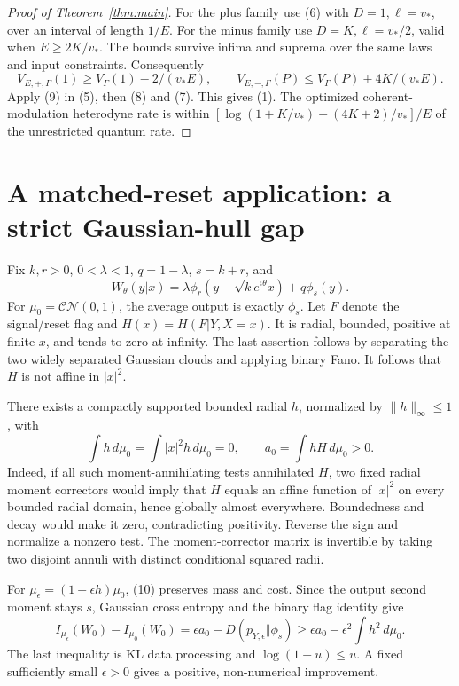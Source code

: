 \documentclass[11pt]{article}
\newcommand{\CN}{\mathcal{CN}}
\begin{document}
\begin{proof}[Proof of Theorem~\ref{thm:main}]
For the plus family use (6) with \(D=1,\ell=v_*\), over an interval
of length \(1/E\). For the minus family use \(D=K,\ell=v_*/2\),
valid when \(E\geq2K/v_*\). The bounds survive infima and suprema over
the same laws and input constraints. Consequently
\[
 V_{E,+,\Gamma}(1)\geq V_\Gamma(1)-2/(v_*E),\qquad
 V_{E,-,\Gamma}(P)\leq V_\Gamma(P)+4K/(v_*E).
\]
Apply (9) in (5), then (8) and (7). This gives (1).
The optimized coherent-modulation heterodyne rate is within
\([\log(1+K/v_*)+(4K+2)/v_*]/E\) of the unrestricted quantum rate.
\end{proof}

\section{A matched-reset application: a strict Gaussian-hull gap}

Fix \(k,r>0\), \(0<\lambda<1\), \(q=1-\lambda\), \(s=k+r\), and
\[
 W_\theta(y|x)=\lambda\phi_r(y-\sqrt k e^{i\theta}x)+q\phi_s(y).
\]
For \(\mu_0=\CN(0,1)\), the average output is exactly \(\phi_s\).
Let \(F\) denote the signal/reset flag and
\(H(x)=H(F|Y,X=x)\). It is radial, bounded, positive at finite \(x\),
and tends to zero at infinity. The last assertion follows by separating
the two widely separated Gaussian clouds and applying binary Fano.
It follows that \(H\) is not affine in \(|x|^2\).

There exists a compactly supported bounded radial \(h\), normalized by
\(\|h\|_\infty\leq1\), with
\[
 \int h\,d\mu_0=\int |x|^2h\,d\mu_0=0,\qquad
 a_0=\int hH\,d\mu_0>0.                                   \tag{10}
\]
Indeed, if all such moment-annihilating tests annihilated \(H\), two
fixed radial moment correctors would imply that \(H\) equals an affine
function of \(|x|^2\) on every bounded radial domain, hence globally
almost everywhere. Boundedness and decay would make it zero,
contradicting positivity. Reverse the sign and normalize a nonzero test.
The moment-corrector matrix is invertible by taking two disjoint annuli
with distinct conditional squared radii.

For \(\mu_\epsilon=(1+\epsilon h)\mu_0\), (10) preserves mass and cost.
Since the output second moment stays \(s\), Gaussian cross entropy and
the binary flag identity give
\[
 I_{\mu_\epsilon}(W_0)-I_{\mu_0}(W_0)
  =\epsilon a_0-D(p_{Y,\epsilon}\Vert\phi_s)
  \geq\epsilon a_0-\epsilon^2\int h^2\,d\mu_0.               \tag{11}
\]
The last inequality is KL data processing and
\(\log(1+u)\leq u\). A fixed sufficiently small \(\epsilon>0\)
gives a positive, non-numerical improvement.
\end{document}
